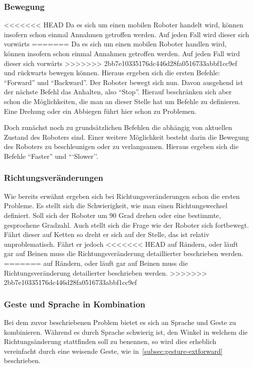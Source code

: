 \subsubsection{Bewegung}

<<<<<<< HEAD
Da es sich um einen mobilen Roboter handelt wird, k\"onnen insofern schon einmal Annahmen getroffen werden. Auf jeden Fall wird dieser sich vorw\"arts 
=======
Da es sich um einen mobilen Roboter handlen wird, k\"onnen insofern schon einmal Annahmen getroffen werden. Auf jeden Fall wird dieser sich vorw\"arts 
>>>>>>> 2bb7e10335176dc446d28fa0516733abbf1cc9ef
und r\"uckwarts bewegen k\"onnen. Hieraus ergeben sich die ersten Befehle: ``Forward'' und ``Backward''. Der Roboter bewegt sich nun. Davon ausgehend 
ist der n\"achste Befehl das Anhalten, also ``Stop''. Hierauf beschr\"anken sich aber schon die M\"oglichkeiten, die man an dieser Stelle hat um 
Befehle zu definieren. Eine Drehung oder ein Abbiegen f\"uhrt hier schon zu Problemen. 

Doch zun\"achst noch zu grunds\"atzlichen Befehlen die abh\"angig von aktuellen Zustand des Roboters sind. Einer weitere M\"oglichkeit besteht 
darin die Bewegung des Roboters zu beschleunigen oder zu verlangsamen. Hieraus ergeben sich die Befehle ``Faster'' und ```Slower''.


\subsubsection{Richtungsver\"anderungen}

Wie bereits erw\"ahnt ergeben sich bei Richtungsver\"anderungen schon die ersten Probleme. Es stellt sich die Schwierigkeit, wie man einen 
Richtungswechsel definiert. Soll sich der Roboter um 90 Grad drehen oder eine bestimmte, gesprochene Gradzahl. Auch stellt sich die Frage wie 
der Roboter sich fortbewegt. F\"ahrt dieser auf Ketten so dreht er sich auf der Stelle, das ist relativ unproblematisch. F\"ahrt er jedoch 
<<<<<<< HEAD
auf R\"andern, oder l\"auft gar auf Beinen muss die Richtungsver\"anderung detaillierter beschrieben werden. 
=======
auf R\"andern, oder l\"auft gar auf Beinen muss die Richtungsver\"anderung detailierter beschrieben werden. 
>>>>>>> 2bb7e10335176dc446d28fa0516733abbf1cc9ef

\subsubsection{Geste und Sprache in Kombination}

Bei dem zuvor beschriebenen Problem bietet es sich an Sprache und Geste zu kombinieren. W\"ahrend es durch Sprache schwierig ist, den Winkel in 
welchem die Richtungs\"anderung stattfinden soll zu benennen, so wird dies erheblich vereinfacht durch eine weisende Geste, wie in~\ref{subsec:gesture-extforward} beschrieben.

